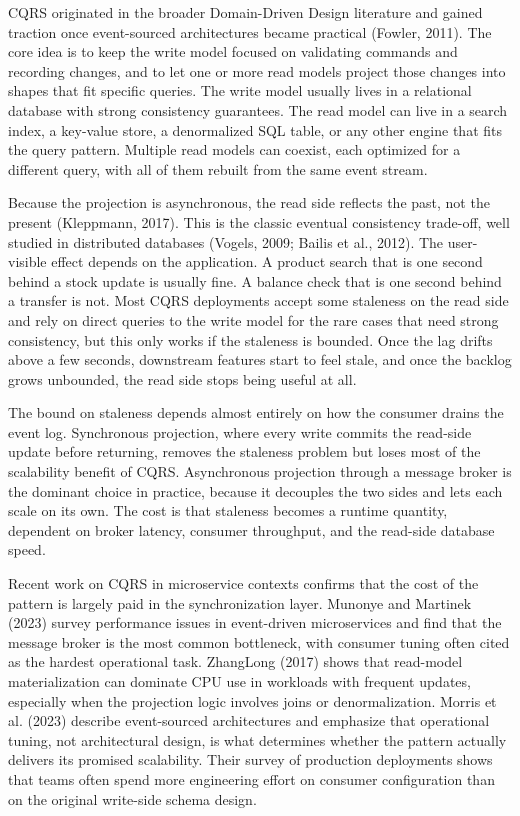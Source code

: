 \documentclass[10pt,a4paper]{article}
\begin{document}
CQRS originated in the broader Domain-Driven Design literature and gained traction once event-sourced architectures became practical (Fowler, 2011). The core idea is to keep the write model focused on validating commands and recording changes, and to let one or more read models project those changes into shapes that fit specific queries. The write model usually lives in a relational database with strong consistency guarantees. The read model can live in a search index, a key-value store, a denormalized SQL table, or any other engine that fits the query pattern. Multiple read models can coexist, each optimized for a different query, with all of them rebuilt from the same event stream.

Because the projection is asynchronous, the read side reflects the past, not the present (Kleppmann, 2017). This is the classic eventual consistency trade-off, well studied in distributed databases (Vogels, 2009; Bailis et al., 2012). The user-visible effect depends on the application. A product search that is one second behind a stock update is usually fine. A balance check that is one second behind a transfer is not. Most CQRS deployments accept some staleness on the read side and rely on direct queries to the write model for the rare cases that need strong consistency, but this only works if the staleness is bounded. Once the lag drifts above a few seconds, downstream features start to feel stale, and once the backlog grows unbounded, the read side stops being useful at all.

The bound on staleness depends almost entirely on how the consumer drains the event log. Synchronous projection, where every write commits the read-side update before returning, removes the staleness problem but loses most of the scalability benefit of CQRS. Asynchronous projection through a message broker is the dominant choice in practice, because it decouples the two sides and lets each scale on its own. The cost is that staleness becomes a runtime quantity, dependent on broker latency, consumer throughput, and the read-side database speed.

Recent work on CQRS in microservice contexts confirms that the cost of the pattern is largely paid in the synchronization layer. Munonye and Martinek (2023) survey performance issues in event-driven microservices and find that the message broker is the most common bottleneck, with consumer tuning often cited as the hardest operational task. ZhangLong (2017) shows that read-model materialization can dominate CPU use in workloads with frequent updates, especially when the projection logic involves joins or denormalization. Morris et al. (2023) describe event-sourced architectures and emphasize that operational tuning, not architectural design, is what determines whether the pattern actually delivers its promised scalability. Their survey of production deployments shows that teams often spend more engineering effort on consumer configuration than on the original write-side schema design.
\end{document}

